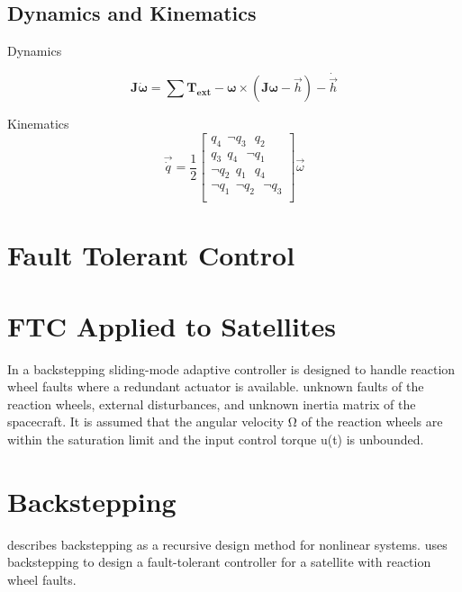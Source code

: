 \subsection{Dynamics and Kinematics}
Dynamics

\begin{equation}
\mathbf{J}\mathbf{\dot{\omega}} = \sum{\mathbf{T_{ext}}} -\mathbf{\omega}\times(\mathbf{J}\mathbf{\omega}-\vec{h})-\dot{\vec{h}}
\end{equation}

Kinematics
\begin{equation}
\vec{\dot{q}}=\frac{1}{2}
\begin{bmatrix}
q_{4} \ \ \neg q_{3} \ \ \ q_{2} \\ 
q_{3} \ \ q_{4} \ \ \ \neg q_{1} \\ 
\neg q_{2} \ \ q_{1} \ \ \ q_{4} \\ 
\neg q_{1} \ \ \neg q_{2} \ \ \ \neg q_{3} \\
\end{bmatrix} \vec{\omega}
\end{equation}
\subsection{}
\section{Fault Tolerant Control}

\section{FTC Applied to Satellites}
In \cite{JiangYe2010Abfc} a backstepping sliding-mode adaptive controller is designed to handle reaction wheel faults where a 
redundant actuator is available. unknown faults of the reaction wheels, external disturbances, and unknown
inertia matrix of the spacecraft. 
It is assumed that the angular velocity Ω of the reaction wheels are within the saturation limit and the input control torque 
u(t) is unbounded.

\section{Backstepping}
\cite{khalilNonlinearSystems2002} describes backstepping as a recursive design method for nonlinear systems.
\cite{ShenQiang2019AFCS} uses backstepping to design a fault-tolerant controller for a satellite with reaction wheel faults.